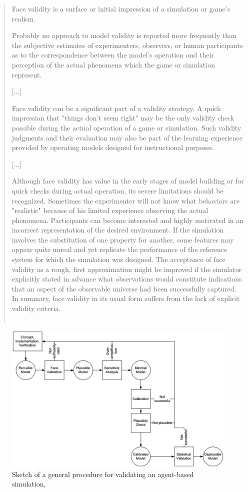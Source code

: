 \begin{quotation}
	\og Face validity is a surface or initial impression of a simulation or game's realism.

	Probably no approach to model validity is reported more frequently than the subjective estimates of experimenters, observers, or human participants as to the correspondence between the model's operation and their perception of the actual phenomena which the game or simulation represent.

	[...]

	Face validity can be a significant part of a validity strategy. A quick impression that "things don't seem right" may be the only validity check possible during the actual operation of a game or simulation. Such validity judgments and their evaluation may also be part of the learning experience provided by operating models designed for instructional purposes.

	[...]

	Although face validity has value in the early stages of model building or for quick checks during actual operation, its severe limitations should be recognized. Sometimes the experimenter will not know what behaviors are "realistic" because of his limited experience observing the actual phenomena. Participants can become interested and highly motivated in an incorrect representation of the desired environment. If the simulation involves the substitution of one property for another, some features may appear quite unreal and yet replicate the performance of the reference system for which the simulation was designed. The acceptance of face validity as a rough, first approximation might be improved if the simulator explicitly stated in advance what observations would constitute indications that an aspect of the observable universe had been successfully captured. In summary, face validity in its usual form suffers from the lack of explicit validity criteria.\fg{}\\
	\mbox{}~ \hfill \cite[221-222]{hermann_validation_1967}
\end{quotation}


\begin{figure}[H]
	\includegraphics[width=\linewidth]{img/Schema_Kluegl.png}
	\caption{\og Sketch of a general procedure for validating an agent-based simulation\fg{}, \cite[fig. 1 p. 42]{klugl_validation_2008}}
	\label{fig:schema_kluegl}
\end{figure}

